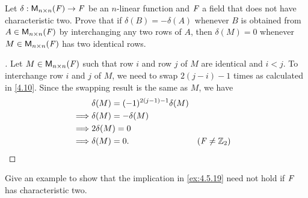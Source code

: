 \begin{ex}\label{ex:4.5.19}
	Let \(\delta : \ms[n][n][\F] \to \F\) be an \(n\)-linear function and \(\mathit{F}\) a field that does not have characteristic two.
	Prove that if \(\delta(B) = -\delta(A)\) whenever \(B\) is obtained from \(A \in \ms[n][n][\F]\) by interchanging any two rows of \(A\), then \(\delta(M) = 0\) whenever \(M \in \ms[n][n][\F]\) has two identical rows.
\end{ex}

\begin{proof}[]
	Let \(M \in \ms[n][n][\F]\) such that row \(i\) and row \(j\) of \(M\) are identical and \(i < j\).
	To interchange row \(i\) and \(j\) of \(M\), we need to swap \(2(j - i) - 1\) times as calculated in \cref{4.10}.
	Since the swapping result is the same as \(M\), we have
	\begin{align*}
		         & \delta(M) = (-1)^{2(j - 1) - 1} \delta(M)                     \\
		\implies & \delta(M) = -\delta(M)                                        \\
		\implies & 2\delta(M) = 0                                                \\
		\implies & \delta(M) = 0.                            &  & (\mathit{F} \neq \mathbb{Z}_2)
	\end{align*}
\end{proof}

\begin{ex}\label{ex:4.5.20}
	Give an example to show that the implication in \cref{ex:4.5.19} need not hold if \(\mathit{F}\) has characteristic two.
\end{ex}

